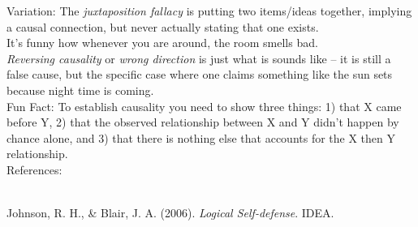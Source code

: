 \documentclass[a4paper,12pt,single,pdftex]{scrartcl}
\begin{document}
{    
      Variation: The {\it juxtaposition fallacy} is putting two items/ideas together, implying a causal connection, but never actually stating that one exists.
    \\

    
      It’s funny how whenever you are around, the room smells bad.
    \\

    
      {\it Reversing causality} or {\it wrong direction }is just what is sounds like -- it is still a false cause, but the specific case where one claims something like the sun sets because night time is coming.
    \\

    
      Fun Fact: To establish causality you need to show three things: 1) that X came before Y, 2) that the observed relationship between X and Y didn't happen by chance alone, and 3) that there is nothing else that accounts for the X then Y relationship.
    \\

    References:

    
      
        
      \\

      
        
          Johnson, R. H., \& Blair, J. A. (2006). {\it Logical Self-defense}. IDEA.
        
      
    
  }
\end{document}
